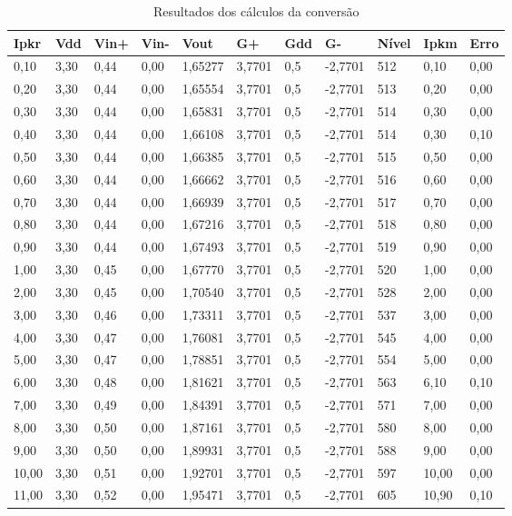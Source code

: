 \begin{table}[H]
    \centering
    \caption{Resultados dos cálculos da conversão}
    \begin{tabular}{|l|l|l|l|l|l|l|l|l|l|l|} 
\hline
Ipkr	&Vdd	&Vin+	&Vin-	&Vout		&G+		&Gdd	&G-	&Nível	&Ipkm	&Erro\\\hline	
0,10	&3,30	&0,44	&0,00	&1,65277	&3,7701	&0,5	&-2,7701	&512	&0,10	&0,00\\\hline
0,20	&3,30	&0,44	&0,00	&1,65554	&3,7701	&0,5	&-2,7701	&513	&0,20	&0,00\\\hline
0,30	&3,30	&0,44	&0,00	&1,65831	&3,7701	&0,5	&-2,7701	&514	&0,30	&0,00\\\hline
0,40	&3,30	&0,44	&0,00	&1,66108	&3,7701	&0,5	&-2,7701	&514	&0,30	&0,10\\\hline
0,50	&3,30	&0,44	&0,00	&1,66385	&3,7701	&0,5	&-2,7701	&515	&0,50	&0,00\\\hline
0,60	&3,30	&0,44	&0,00	&1,66662	&3,7701	&0,5	&-2,7701	&516	&0,60	&0,00\\\hline
0,70	&3,30	&0,44	&0,00	&1,66939	&3,7701	&0,5	&-2,7701	&517	&0,70	&0,00\\\hline
0,80	&3,30	&0,44	&0,00	&1,67216	&3,7701	&0,5	&-2,7701	&518	&0,80	&0,00\\\hline
0,90	&3,30	&0,44	&0,00	&1,67493	&3,7701	&0,5	&-2,7701	&519	&0,90	&0,00\\\hline
1,00	&3,30	&0,45	&0,00	&1,67770	&3,7701	&0,5	&-2,7701	&520	&1,00	&0,00\\\hline
2,00	&3,30	&0,45	&0,00	&1,70540	&3,7701	&0,5	&-2,7701	&528	&2,00	&0,00\\\hline
3,00	&3,30	&0,46	&0,00	&1,73311	&3,7701	&0,5	&-2,7701	&537	&3,00	&0,00\\\hline
4,00	&3,30	&0,47	&0,00	&1,76081	&3,7701	&0,5	&-2,7701	&545	&4,00	&0,00\\\hline
5,00	&3,30	&0,47	&0,00	&1,78851	&3,7701	&0,5	&-2,7701	&554	&5,00	&0,00\\\hline
6,00	&3,30	&0,48	&0,00	&1,81621	&3,7701	&0,5	&-2,7701	&563	&6,10	&0,10\\\hline
7,00	&3,30	&0,49	&0,00	&1,84391	&3,7701	&0,5	&-2,7701	&571	&7,00	&0,00\\\hline
8,00	&3,30	&0,50	&0,00	&1,87161	&3,7701	&0,5	&-2,7701	&580	&8,00	&0,00\\\hline
9,00	&3,30	&0,50	&0,00	&1,89931	&3,7701	&0,5	&-2,7701	&588	&9,00	&0,00\\\hline
10,00	&3,30	&0,51	&0,00	&1,92701	&3,7701	&0,5	&-2,7701	&597	&10,00	&0,00\\\hline
11,00	&3,30	&0,52	&0,00	&1,95471	&3,7701	&0,5	&-2,7701	&605	&10,90	&0,10\\\hline

\end{tabular}
\end{table}
